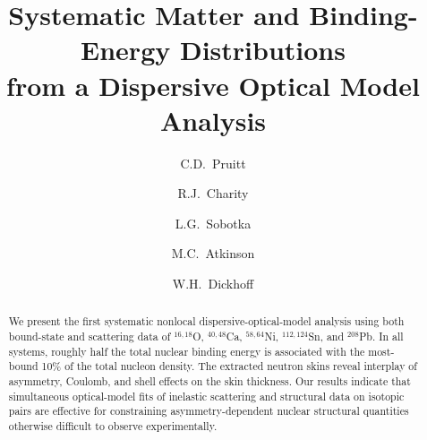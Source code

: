 \documentclass[twocolumn,secnumarabic,amssymb, nobibnotes, aps, prl, superscriptaddress, nobalancelastpage]{revtex4-1}
\newcommand{\oSixEight}{\ensuremath{^{16,18}}O}
\newcommand{\caAughtEight}{\ensuremath{^{40,48}}C\lowercase{a}}
\newcommand{\niEightFour}{\ensuremath{^{58,64}}N\lowercase{i}}
\newcommand{\snTwelveFour}{\ensuremath{^{112,124}}S\lowercase{n}}
\newcommand{\pbEight}{\ensuremath{^{208}}P\lowercase{b}}
\begin{document}
\title{Systematic Matter and Binding-Energy Distributions\\
from a Dispersive Optical Model Analysis}

\author{C.D.~Pruitt}%

\author{R.J.~Charity}

\author{L.G.~Sobotka}

\author{M.C.~Atkinson}

\author{W.H.~Dickhoff}

\begin{abstract}
    We present the first systematic nonlocal dispersive-optical-model analysis using both
    bound-state and scattering data of \oSixEight, \caAughtEight, \niEightFour, \snTwelveFour,
    and \pbEight. In all systems, roughly half the total nuclear binding energy is associated with the
    most-bound 10\% of the total nucleon density. The extracted neutron skins
    reveal interplay of asymmetry, Coulomb, and shell effects on the skin
    thickness. Our results indicate that simultaneous optical-model fits of inelastic
    scattering and structural data on isotopic pairs are effective for
    constraining asymmetry-dependent nuclear structural quantities otherwise difficult
    to observe experimentally.
\end{abstract} 

\maketitle
\end{document}
